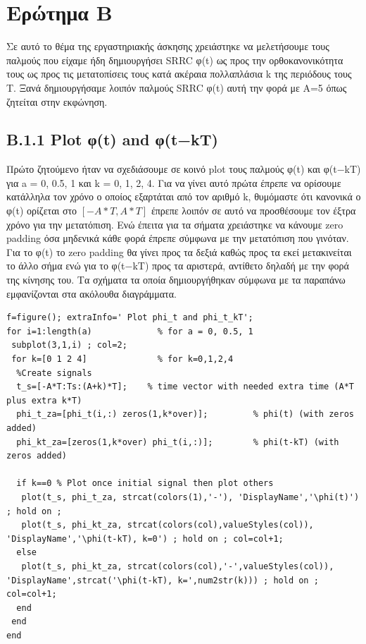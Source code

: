 \documentclass[11pt]{article}
\begin{document}
    
    \section{Ερώτημα B}
    Σε αυτό το θέμα της εργαστηριακής άσκησης χρειάστηκε να μελετήσουμε τους παλμούς που είχαμε ήδη δημιουργήσει SRRC φ(t) ως προς την ορθοκανονικότητα τους ως προς τις μετατοπίσεις τους κατά ακέραια πολλαπλάσια k της περιόδους τους Τ. Ξανά δημιουργήσαμε λοιπόν παλμούς SRRC φ(t) αυτή την φορά με Α=5 όπως ζητείται στην εκφώνηση.
    
    \subsection*{B.1.1 Plot φ(t) and φ(t−kT)}
     Πρώτο ζητούμενο ήταν να σχεδιάσουμε σε κοινό plot τους παλμούς φ(t) και φ(t−kT) για a = 0, 0.5, 1 και k = 0, 1, 2, 4. Για να γίνει αυτό πρώτα έπρεπε να ορίσουμε κατάλληλα τον χρόνο ο οποίος εξαρτάται από τον αριθμό k, θυμόμαστε ότι κανονικά ο φ(t) ορίζεται στο $[-A*T, A*T]$ έπρεπε λοιπόν σε αυτό να προσθέσουμε τον έξτρα χρόνο για την μετατόπιση. Ενώ έπειτα για τα σήματα χρειάστηκε να κάνουμε zero padding όσα μηδενικά κάθε φορά έπρεπε σύμφωνα με την μετατόπιση που γινόταν. Για το φ(t) το zero padding θα γίνει προς τα δεξιά καθώς προς τα εκεί μετακινείται το άλλο σήμα ενώ για το φ(t−kT) προς τα αριστερά, αντίθετο δηλαδή με την φορά της κίνησης του. Τα σχήματα τα οποία δημιουργήθηκαν σύμφωνα με τα παραπάνω εμφανίζονται στα ακόλουθα διαγράμματα. 
     
\begin{lstlisting}[caption = {B.1.1}]
f=figure(); extraInfo=' Plot phi_t and phi_t_kT';
for i=1:length(a)             % for a = 0, 0.5, 1
 subplot(3,1,i) ; col=2;
 for k=[0 1 2 4]              % for k=0,1,2,4
  %Create signals
  t_s=[-A*T:Ts:(A+k)*T];    % time vector with needed extra time (A*T plus extra k*T)
  phi_t_za=[phi_t(i,:) zeros(1,k*over)];         % phi(t) (with zeros added)
  phi_kt_za=[zeros(1,k*over) phi_t(i,:)];        % phi(t-kT) (with zeros added)

  if k==0 % Plot once initial signal then plot others
   plot(t_s, phi_t_za, strcat(colors(1),'-'), 'DisplayName','\phi(t)') ; hold on ; 
   plot(t_s, phi_kt_za, strcat(colors(col),valueStyles(col)), 'DisplayName','\phi(t-kT), k=0') ; hold on ; col=col+1; 
  else
   plot(t_s, phi_kt_za, strcat(colors(col),'-',valueStyles(col)), 'DisplayName',strcat('\phi(t-kT), k=',num2str(k))) ; hold on ; col=col+1; 
  end
 end
end
\end{lstlisting}
    
\end{document}
